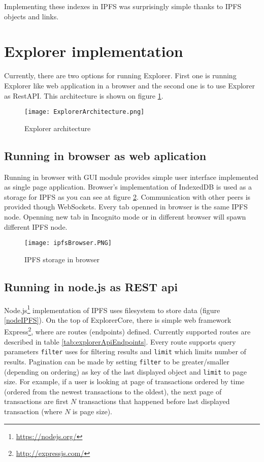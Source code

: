 Implementing these indexes in IPFS was surprisingly simple thanks to IPFS objects and links.


\section{Explorer implementation}
Currently, there are two options for running Explorer. First one is running Explorer like web application in a browser and the second one is to use Explorer as RestAPI. This architecture is shown on figure \ref{ExplorerArchitecture}.

\begin{figure}[h]
    \centering
    \texttt{[image: ExplorerArchitecture.png]}
    \caption{Explorer architecture}
    \label{ExplorerArchitecture}
\end{figure}

\subsection{Running in browser as web aplication}
Running in browser with GUI module provides simple user interface implemented as single page application. Browser's implementation of IndexedDB is used as a storage for IPFS as you can see at figure \ref{browserIPFS}. Communication with other peers is provided though WebSockets. Every tab openned in browser is the same IPFS node. Openning new tab in Incognito mode or in different browser will spawn different IPFS node.

\begin{figure}[h]
    \centering
    \texttt{[image: ipfsBrowser.PNG]}
    \caption{IPFS storage in browser}
    \label{browserIPFS}
\end{figure}


\subsection{Running in node.js as REST api }
Node.js\footnote{\url{https://nodejs.org/}} implementation of IPFS uses filesystem to store data (figure \ref{nodeIPFS}). On the top of ExplorerCore, there is simple web framework Express\footnote{\url{http://expressjs.com/}}, where are routes (endpoints) defined. Currently supported routes are described in table \ref{tab:explorerApiEndpoints}. Every route supports query parameters \texttt{filter} uses for filtering results and \texttt{limit} which limits number of results. Pagination can be made by setting \texttt{filter} to be greater/smaller (depending on ordering) as key of the last displayed object and \texttt{limit} to page size. For example, if a user is looking at page of transactions ordered by time (ordered from the newest transactions to the oldest), the next page of transactions are first \(N\) transactions that happened before last displayed transaction (where \(N\) is page size).

